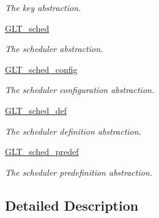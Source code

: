 \begin{DoxyCompactItemize}
\begin{DoxyCompactList}\small\item\em The key abstraction. \end{DoxyCompactList}\item 
\hypertarget{group__OBJECTS_gab02c120fc3e930ea3d1da65a21eaa6d6}{\hyperlink{group__OBJECTS_gab02c120fc3e930ea3d1da65a21eaa6d6}{G\-L\-T\-\_\-sched}}\label{group__OBJECTS_gab02c120fc3e930ea3d1da65a21eaa6d6}

\begin{DoxyCompactList}\small\item\em The scheduler abstraction. \end{DoxyCompactList}\item 
\hypertarget{group__OBJECTS_gab393527352365f0881587bfa6fe7bd58}{\hyperlink{group__OBJECTS_gab393527352365f0881587bfa6fe7bd58}{G\-L\-T\-\_\-sched\-\_\-config}}\label{group__OBJECTS_gab393527352365f0881587bfa6fe7bd58}

\begin{DoxyCompactList}\small\item\em The scheduler configuration abstraction. \end{DoxyCompactList}\item 
\hypertarget{group__OBJECTS_ga75b80f18f714c964bef84c3f420569ca}{\hyperlink{group__OBJECTS_ga75b80f18f714c964bef84c3f420569ca}{G\-L\-T\-\_\-sched\-\_\-def}}\label{group__OBJECTS_ga75b80f18f714c964bef84c3f420569ca}

\begin{DoxyCompactList}\small\item\em The scheduler definition abstraction. \end{DoxyCompactList}\item 
\hypertarget{group__OBJECTS_ga097f915ddbfeb042981472405836633f}{\hyperlink{group__OBJECTS_ga097f915ddbfeb042981472405836633f}{G\-L\-T\-\_\-sched\-\_\-predef}}\label{group__OBJECTS_ga097f915ddbfeb042981472405836633f}

\begin{DoxyCompactList}\small\item\em The scheduler predefinition abstraction. \end{DoxyCompactList}\end{DoxyCompactItemize}


\subsection{Detailed Description}
